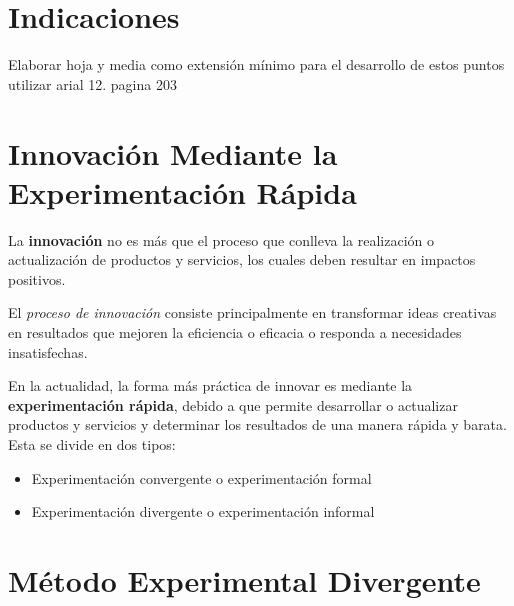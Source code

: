 	\clearpage
	\tableofcontents




	\clearpage
	\vspace*{-16pt}
	\begin{center}
		{\textbf{\huge \theTitle}}
	\end{center}
	\vspace*{8pt}


	\section*{Indicaciones}

	Elaborar hoja y media como extensión mínimo para el desarrollo de estos puntos
	utilizar arial 12. pagina 203

	\clearpage
	\section{Innovación Mediante la Experimentación Rápida}

	La \textbf{innovación} no es más que el proceso que conlleva la realización
	o actualización de productos y servicios, los cuales deben resultar en impactos
	positivos.

	El \textit{proceso de innovación} consiste principalmente en transformar ideas
	creativas en resultados que mejoren la eficiencia o eficacia o responda a
	necesidades insatisfechas.

	En la actualidad, la forma más práctica de innovar es mediante la \textbf{
	experimentación rápida}, debido a que permite desarrollar o actualizar
	productos y servicios y determinar los resultados de una manera rápida y
	barata. Esta se divide en dos tipos:

	\begin{itemize}
		\item Experimentación convergente o experimentación formal
		\item Experimentación divergente o experimentación informal
	\end{itemize}

	\clearpage
	\section{Método Experimental Divergente}

